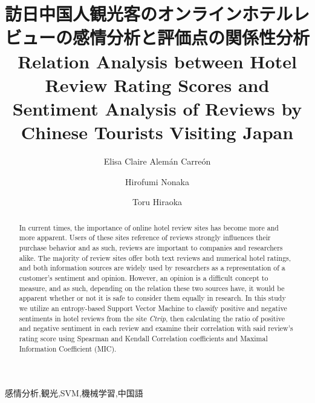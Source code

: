 \documentclass[review]{elsarticle}
\begin{document}
\begin{CJK}{UTF8}{min}

\begin{frontmatter}

\title{訪日中国人観光客のオンラインホテルレビューの感情分析と評価点の関係性分析 \\ Relation Analysis between Hotel Review Rating Scores and Sentiment Analysis of Reviews by Chinese Tourists Visiting Japan}

\author[gidai]{Elisa Claire Alem\'an Carre\'on
}

\author[gidai]{Hirofumi Nonaka}

\author[nagasaki]{Toru Hiraoka}

\address[gidai]{Nagaoka University of Technology, Nagaoka, Japan}
\address[nagasaki]{University of Nagasaki, Nagasaki, Japan}


\begin{abstract}

In current times, the importance of online hotel review sites has become more and more apparent. Users of these sites reference of reviews strongly influences their purchase behavior and as such, reviews are important to companies and researchers alike. The majority of review sites offer both text reviews and numerical hotel ratings, and both information sources are widely used by researchers as a representation of a customer's sentiment and opinion. However, an opinion is a difficult concept to measure, and as such, depending on the relation these two sources have, it would be apparent whether or not it is safe to consider them equally in research. In this study we utilize an entropy-based Support Vector Machine to classify positive and negative sentiments in hotel reviews from the site \textit{Ctrip}, then calculating the ratio of positive and negative sentiment in each review and examine their correlation with said review's rating score using Spearman and Kendall Correlation coefficients and Maximal Information Coefficient (MIC).


\end{abstract}

\begin{keyword}

感情分析\sep 観光\sep SVM\sep 機械学習\sep 中国語


\end{keyword}
\end{frontmatter}
\end{CJK}
\end{document}

